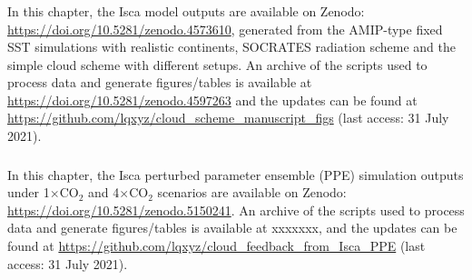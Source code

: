 \subsubsection{}

In this chapter, the Isca model outputs are available on Zenodo: \url{https://doi.org/10.5281/zenodo.4573610}, generated from the AMIP-type fixed SST simulations with realistic continents, SOCRATES radiation scheme and the simple cloud scheme with different setups. An archive of the scripts used to process data and generate figures/tables is available at \url{https://doi.org/10.5281/zenodo.4597263} and the updates can be found at \url{https://github.com/lqxyz/cloud_scheme_manuscript_figs} (last access: 31 July 2021).

\subsubsection{}

In this chapter, the Isca perturbed parameter ensemble (PPE) simulation outputs under 1$\times$CO$_2$ and 4$\times$CO$_2$ scenarios are available on Zenodo: \url{https://doi.org/10.5281/zenodo.5150241}. An archive of the scripts used to process data and generate figures/tables is available at xxxxxxx, and the updates can be found at \url{https://github.com/lqxyz/cloud_feedback_from_Isca_PPE} (last access: 31 July 2021).
